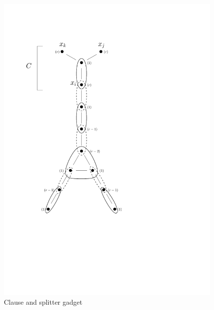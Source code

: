 \documentclass{acm_proc_article-sp}
\begin{document}
\begin{figure}[htbp]
\begin{center}
\includegraphics[scale=.6]{figs/hardness}
\caption{Clause and splitter gadget}
\label{fig:3satconstruction}
\end{center}
\vspace{-5pt}
\end{figure}
\end{document}
